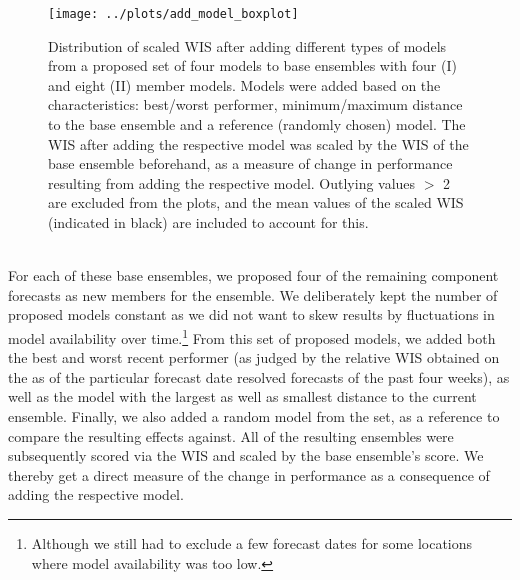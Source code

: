 \begin{figure}
\centering
\texttt{[image: ../plots/add\_model\_boxplot]}
\caption{Distribution of scaled WIS after adding different types of models from a proposed set of four models to base ensembles with four (I) and eight (II) member models. Models were added based on the characteristics: best/worst performer, minimum/maximum distance to the base ensemble and a reference (randomly chosen) model. The WIS after adding the respective model was scaled by the WIS of the base ensemble beforehand, as a measure of change in performance resulting from adding the respective model. Outlying values $>$ 2 are excluded from the plots, and the mean values of the scaled WIS (indicated in black) are included to account for this.}
\label{fig:spread_gamma}
\end{figure}\\
For each of these base ensembles, we proposed four of the remaining component forecasts as new members for the ensemble. We deliberately kept the number of proposed models constant as we did not want to skew results by fluctuations in model availability over time.\footnote{Although we still had to exclude a few forecast dates for some locations where model availability was too low.} From this set of proposed models, we added both the best and worst recent performer (as judged by the relative WIS obtained on the as of the particular forecast date resolved forecasts of the past four weeks), as well as the model with the largest as well as smallest distance to the current ensemble. Finally, we also added a random model from the set, as a reference to compare the resulting effects against. All of the resulting ensembles were subsequently scored via the WIS and scaled by the base ensemble's score. We thereby get a direct measure of the change in performance as a consequence of adding the respective model.\\
